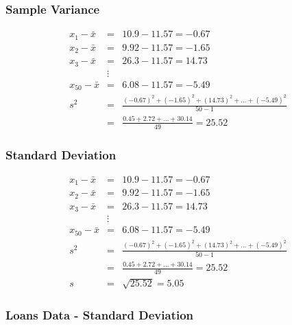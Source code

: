 \documentclass{beamer}
\begin{document}
\begin{frame}
  \frametitle{Sample Variance}
  \begin{displaymath}
    \begin{array}{rcl}
      x_1 - \bar{x} & = & 10.9 - 11.57 = -0.67 \\[0.3em]
      x_2 - \bar{x} & = & 9.92 - 11.57 = -1.65 \\[0.3em]
      x_3 - \bar{x} & = & 26.3 - 11.57 = 14.73 \\[0.3em]
      & \vdots & \\[0.3em]
      x_{50} - \bar{x} & = & 6.08 - 11.57 = -5.49 \\[1em]
      s^2 & = & \frac{(-0.67)^2 + (-1.65)^2 + (14.73)^2 + \ldots +
      (-5.49)^2}{50-1} \\[1em]
      & = & \frac{0.45 + 2.72 + \ldots + 30.14}{49} = 25.52 
    \end{array}
  \end{displaymath} 
\end{frame}

\begin{frame}
  \frametitle{Standard Deviation}
  \begin{displaymath}
    \begin{array}{rcl}
      x_1 - \bar{x} & = & 10.9 - 11.57 = -0.67 \\[0.3em]
      x_2 - \bar{x} & = & 9.92 - 11.57 = -1.65 \\[0.3em]
      x_3 - \bar{x} & = & 26.3 - 11.57 = 14.73 \\[0.3em]
      & \vdots & \\[0.3em]
      x_{50} - \bar{x} & = & 6.08 - 11.57 = -5.49 \\[1em]
      s^2 & = & \frac{(-0.67)^2 + (-1.65)^2 + (14.73)^2 + \ldots +
      (-5.49)^2}{50-1} \\[1em]
      & = & \frac{0.45 + 2.72 + \ldots + 30.14}{49} = 25.52 \\[1em]
      s & = & \sqrt{25.52} = 5.05 
    \end{array}
  \end{displaymath} 
\end{frame}

\begin{frame}
  \frametitle{Loans Data - Standard Deviation}
  \centering
\end{frame}
\end{document}
